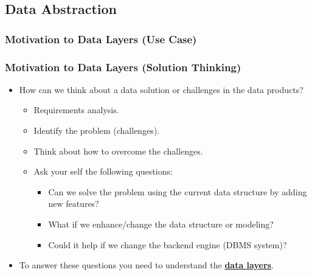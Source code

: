 
\VideoClassification[column=2, colour=blue]
\subsection{Data Abstraction}
\begin{frame}
    \frametitle{Motivation to Data Layers (Use Case)}
    

\end{frame}
\begin{frame}
    \frametitle{Motivation to Data Layers (Solution Thinking)}

    \begin{itemize}[<+->]
        \item How can we think about a data solution or challenges in the data products?
        \begin{itemize}[<+->]
            \item Requirements analysis.
            \item Identify the problem (challenges).
            \item Think about how to overcome the challenges.
            \item Ask your self the following questions:
            \begin{itemize}[<+->]
                \item Can we solve the problem using the current data structure by adding new features?
                \item What if we enhance/change the data structure or modeling?
                \item Could it help if we change the backend engine \forexample (DBMS system)?
            \end{itemize}
        \end{itemize}
        \item To answer these questions you need to understand the \textbf{\underline{data layers}}.
    \end{itemize}

\end{frame}
